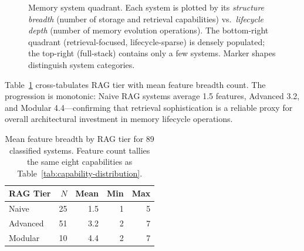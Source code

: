 \begin{figure}[!t]
\caption{Memory system quadrant.  Each system is plotted by its
\emph{structure breadth} (number of storage and retrieval capabilities) vs.\
\emph{lifecycle depth} (number of memory evolution operations).  The
bottom-right quadrant (retrieval-focused, lifecycle-sparse) is densely
populated; the top-right (full-stack) contains only a few systems.
Marker shapes distinguish system categories.}
\label{fig:quadrant}
\end{figure}

Table~\ref{tab:rag-breadth} cross-tabulates RAG tier with mean feature
breadth count.  The progression is monotonic: Naive RAG systems average
1.5 features, Advanced 3.2, and Modular 4.4---confirming that retrieval
sophistication is a reliable proxy for overall architectural investment
in memory lifecycle operations.

\begin{table}[!t]
\centering
\caption{Mean feature breadth by RAG tier for 89 classified systems.
Feature count tallies the same eight capabilities as
Table~\ref{tab:capability-distribution}.}
\label{tab:rag-breadth}
\small
\begin{tabular}{@{}lrrrr@{}}
\toprule
\textbf{RAG Tier} & \textbf{$N$} & \textbf{Mean} & \textbf{Min} & \textbf{Max} \\
\midrule
Naive    & 25 & 1.5 & 1 & 5 \\
Advanced & 51 & 3.2 & 2 & 7 \\
Modular  & 10 & 4.4 & 2 & 7 \\
\bottomrule
\end{tabular}
\end{table}

